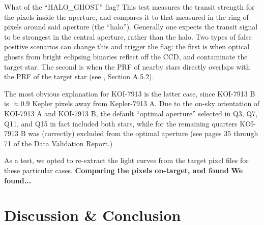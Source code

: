 \documentclass[12pt,twocolumn,linenumbers]{aastex63}
\begin{document}
What of the ``HALO\_GHOST'' flag?  This test measures the transit
strength for the pixels inside the aperture, and compares it to that
measured in the ring of pixels around said aperture (the ``halo'').
Generally one expects the transit signal to be strongest in the
central aperture, rather than the halo.  Two types of false positive
scenarios can change this and trigger the flag: the first is when
optical ghosts from bright eclipsing binaries reflect off the CCD, and
contaminate the target star.  The second is when the PRF of nearby
stars directly overlaps with the PRF of the target star (see
\citealt{thompson_planetary_2018}, Section A.5.2).

The most obvious explanation for KOI-7913 is the latter case, since
KOI-7913 B is $\approx0.9$ Kepler pixels away from Kepler-7913 A.  Due
to the on-sky orientation of KOI-7913 A and KOI-7913 B, the default
``optimal aperture'' selected in Q3, Q7, Q11, and Q15 in fact included
both stars, while for the remaining quarters KOI-7913 B was
(correctly) excluded from the optimal aperture (see pages 35 through
71 of the Data Validation Report.)

As a test, we opted to re-extract the light curves from the target
pixel files for these particular cases.
{\bf Comparing the pixels on-target, and found}
{\bf We found...}



\section{Discussion \& Conclusion}
\label{sec:disc_conc}
\end{document}
